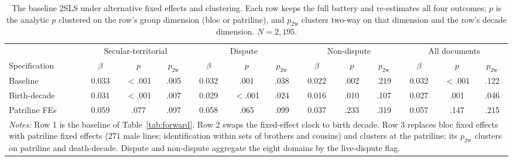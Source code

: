 \documentclass[12pt]{article}
\theoremstyle{definition}
\theoremstyle{remark}
\begin{document}
\begin{table}[t]
\centering
\caption{The baseline 2SLS under alternative fixed effects and clustering. Each row keeps the full battery and re-estimates all four outcomes; $p$ is the analytic $p$ clustered on the row's group dimension (bloc or patriline), and $p_{\text{2w}}$ clusters two-way on that dimension and the row's decade dimension. $N = 2{,}195$.}
\label{tab:app_fe_headline}
{\footnotesize\setlength{\tabcolsep}{3pt}
\begin{tabular}{lcccccccccccc}
\toprule
 & \multicolumn{3}{c}{Secular-territorial} & \multicolumn{3}{c}{Dispute} & \multicolumn{3}{c}{Non-dispute} & \multicolumn{3}{c}{All documents} \\
\cmidrule(lr){2-4}\cmidrule(lr){5-7}\cmidrule(lr){8-10}\cmidrule(lr){11-13}
Specification & $\beta$ & $p$ & $p_{\text{2w}}$ & $\beta$ & $p$ & $p_{\text{2w}}$ & $\beta$ & $p$ & $p_{\text{2w}}$ & $\beta$ & $p$ & $p_{\text{2w}}$ \\
\midrule
Baseline & 0.033 & $<$.001 & .005 & 0.032 & .001 & .038 & 0.022 & .002 & .219 & 0.032 & $<$.001 & .122 \\
Birth-decade & 0.031 & $<$.001 & .007 & 0.029 & $<$.001 & .024 & 0.016 & .010 & .107 & 0.027 & .001 & .046 \\
Patriline FEs & 0.059 & .077 & .097 & 0.058 & .065 & .099 & 0.037 & .233 & .319 & 0.057 & .147 & .215 \\
\midrule
\multicolumn{13}{p{0.96\textwidth}}{\footnotesize \textit{Notes:} Row 1 is the baseline of Table~\ref{tab:forward}. Row 2 swaps the fixed-effect clock to birth decade. Row 3 replaces bloc fixed effects with patriline fixed effects ($271$ male lines; identification within sets of brothers and cousins) and clusters at the patriline; its $p_{\text{2w}}$ clusters on patriline and death-decade. Dispute and non-dispute aggregate the eight domains by the live-dispute flag.} \\
\bottomrule
\end{tabular}
}
\end{table}
\end{document}
